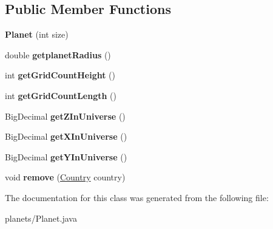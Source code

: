 \subsection*{Public Member Functions}
\begin{DoxyCompactItemize}
\item 
{\bfseries Planet} (int size)\hypertarget{classplanets_1_1_planet_a080d6f492dabfd533ed74fbaa20b4d27}{}\label{classplanets_1_1_planet_a080d6f492dabfd533ed74fbaa20b4d27}

\item 
double {\bfseries getplanet\+Radius} ()\hypertarget{classplanets_1_1_planet_ae823f5423f94ac579a8fbe47518c5839}{}\label{classplanets_1_1_planet_ae823f5423f94ac579a8fbe47518c5839}

\item 
int {\bfseries get\+Grid\+Count\+Height} ()\hypertarget{classplanets_1_1_planet_a01ceef7c97a0b4307e1e3712ff148ad2}{}\label{classplanets_1_1_planet_a01ceef7c97a0b4307e1e3712ff148ad2}

\item 
int {\bfseries get\+Grid\+Count\+Length} ()\hypertarget{classplanets_1_1_planet_a3771ed82aac5a07b9dafd4534e4be377}{}\label{classplanets_1_1_planet_a3771ed82aac5a07b9dafd4534e4be377}

\item 
Big\+Decimal {\bfseries get\+Z\+In\+Universe} ()\hypertarget{classplanets_1_1_planet_a1551d377e25f74b20c0f25528ba5b2ba}{}\label{classplanets_1_1_planet_a1551d377e25f74b20c0f25528ba5b2ba}

\item 
Big\+Decimal {\bfseries get\+X\+In\+Universe} ()\hypertarget{classplanets_1_1_planet_aa3481721d4602a1a4c8b1f64d514862f}{}\label{classplanets_1_1_planet_aa3481721d4602a1a4c8b1f64d514862f}

\item 
Big\+Decimal {\bfseries get\+Y\+In\+Universe} ()\hypertarget{classplanets_1_1_planet_a606fc0c5b4f0c8beabbb9fee1371196e}{}\label{classplanets_1_1_planet_a606fc0c5b4f0c8beabbb9fee1371196e}

\item 
void {\bfseries remove} (\hyperlink{classplanets_1_1_country}{Country} country)\hypertarget{classplanets_1_1_planet_a03e4baf6b70bd58ce222f13b342f8524}{}\label{classplanets_1_1_planet_a03e4baf6b70bd58ce222f13b342f8524}

\end{DoxyCompactItemize}


The documentation for this class was generated from the following file\+:\begin{DoxyCompactItemize}
\item 
planets/Planet.\+java\end{DoxyCompactItemize}
